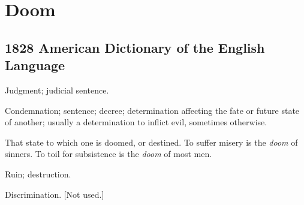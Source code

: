 \section{Doom}
	\label{DOOM}
	

\subsection{1828 American Dictionary of the English Language} %
	\label{DOOM-1828}

	\begin{compactitem}
		\item[1] Judgment; judicial sentence.
		\item[2] Condemnation; sentence; decree; determination affecting the fate or future state of another; usually a determination to inflict evil, sometimes otherwise.
		\item[3] That state to which one is doomed, or destined. To suffer misery is the \textit{doom} of sinners. To toil for subsistence is the \textit{doom} of most men.
		\item[4] Ruin; destruction.
		\item[5] Discrimination. [Not used.]
	\end{compactitem}




